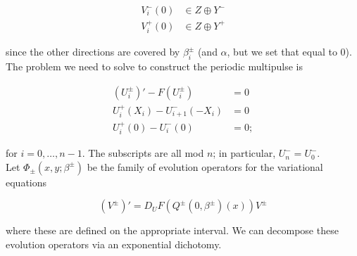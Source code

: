 \documentclass[12pt]{article}
\begin{document}
\begin{align*}
V_i^-(0) &\in Z \oplus Y^- \\
V_i^+(0) &\in Z \oplus Y^+
\end{align*}

since the other directions are covered by $\beta_i^\pm$ (and $\alpha$, but we set that equal to 0).\\

The problem we need to solve to construct the periodic multipulse is

\begin{align}
(U_i^\pm)' - F(U_i^\pm) &= 0 \\
U_i^+(X_i) - U_{i+1}^-(-X_i) &= 0 \\
U_i^+(0) - U_i^-(0) &= 0;
\end{align}

for $i = 0, \dots, {n-1}$. The subscripts are all mod $n$; in particular, $U_n^- = U_0^-$.\\

Let $\Phi_\pm(x, y; \beta^\pm)$ be the family of evolution operators for the variational equations

\begin{equation}
(V^\pm)' = D_U F(Q^\pm(0, \beta^\pm)(x)) V^\pm
\end{equation}

where these are defined on the appropriate interval. We can decompose these evolution operators via an exponential dichotomy.
\end{document}
